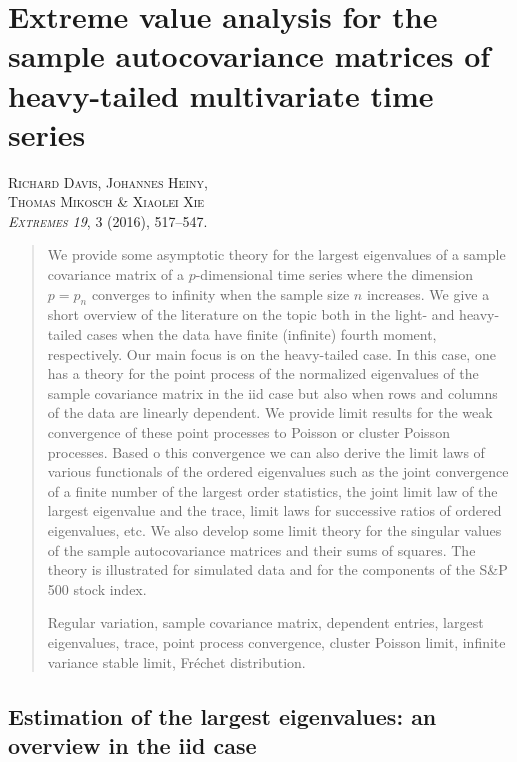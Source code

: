 \chapter[Extreme value analysis for the sample autocovariance matrices of heavy-tailed multivariate time series]{{\huge Extreme value analysis for the sample autocovariance matrices of heavy-tailed multivariate time series}}\label{ch:extremes}

\begin{center}
\textsc{Richard Davis, Johannes Heiny, \\Thomas Mikosch \& Xiaolei Xie\\
{\em Extremes 19}, 3 (2016), 517--547.}
\end{center}

\begin{abstract}{We  provide some  asymptotic theory for the largest eigenvalues of a sample covariance matrix
of a $p$-dimensional time series where the dimension $p=p_n$ converges to infinity when the sample size $n$ increases.
We give a short overview of the literature on the topic both in the light- and heavy-tailed cases when the data have
finite (infinite) fourth moment, respectively.
Our main focus is on the heavy-tailed case. In this case, one has a theory for the point process of the normalized eigenvalues
of the sample covariance matrix in the iid case but also when rows and columns of the data are linearly dependent.
We provide limit results for the weak convergence of these point processes to Poisson or cluster Poisson processes. Based o
this convergence we can also derive the limit laws of various functionals of the ordered eigenvalues such as the
joint convergence of a finite number of the largest order statistics, the joint limit law of the largest eigenvalue and the trace,
limit laws for successive ratios of ordered eigenvalues,
etc. We also develop some
limit theory for the singular values of the sample autocovariance matrices and their sums of squares. The theory is illustrated
for simulated data and for the components of the S\&P 500 stock index.
\medskip

 Regular variation, sample covariance matrix, dependent entries,
largest  eigenvalues, trace, point process
  convergence, cluster Poisson limit,
infinite variance stable limit, Fr\'echet distribution.}
\end{abstract}

\newpage
\section[Estimation of the largest eigenvalues]{Estimation of the largest eigenvalues: an overview in the iid case}\label{sec:motivationch3}

